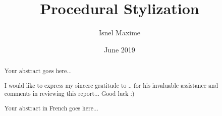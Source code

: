 \documentclass[12pt, a4paper]{memoir} %
\title{Procedural Stylization} %
\author{Isnel Maxime}
\date{June 2019} %
\begin{document}
\frontmatter
\begin{titlingpage}
\maketitle
\end{titlingpage}

\setlength{\parskip}{-1pt plus 1pt}

\renewcommand{\abstracttextfont}{\normalfont}
\abstractintoc
\begin{abstract}
Your abstract goes here...
\end{abstract}
\abstractintoc

\renewcommand\abstractname{Acknowledgement}
\begin{abstract}
I would like to express my sincere gratitude to .. for his invaluable assistance and comments in reviewing this report...
Good luck :)
\end{abstract}


\renewcommand\abstractname{R\'esum\'e}
\begin{abstract} 
Your abstract in French goes here...
\end{abstract}

\cleardoublepage

\tableofcontents* %
\normalsize

\mainmatter
\SingleSpace


%
%


\backmatter



\end{document}
